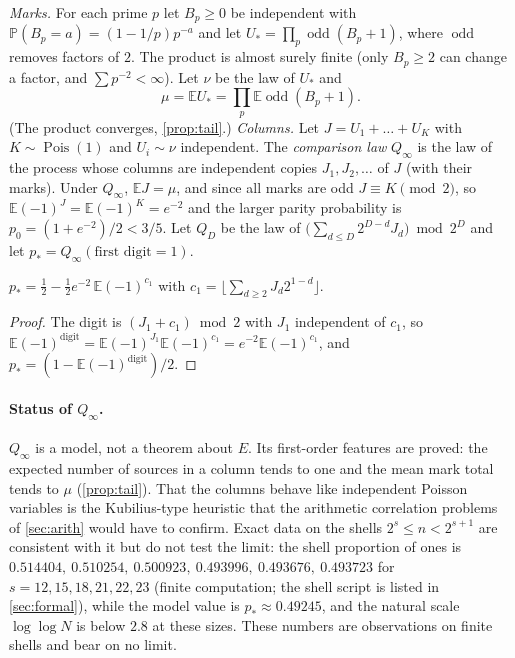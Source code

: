 \documentclass[11pt]{article}
\DeclareMathOperator{\Pois}{Pois}
\renewcommand{\Pr}{\mathbb P}
\newcommand{\Ex}{\mathbb E}
\newcommand{\Qinf}{{Q_\infty}}
\begin{document}
\emph{Marks.} For each prime $p$ let $B_p\ge0$ be independent with $\Pr(B_p=a)=(1-1/p)p^{-a}$ and let $U_*=\prod_p\operatorname{odd}(B_p+1)$, where $\operatorname{odd}$ removes factors of $2$. The product is almost surely finite (only $B_p\ge2$ can change a factor, and $\sum p^{-2}<\infty$). Let $\nu$ be the law of $U_*$ and
\[
\mu=\Ex U_*=\prod_p\Ex\operatorname{odd}(B_p+1).
\]
(The product converges, \cref{prop:tail}.) \emph{Columns.} Let $J=U_1+\dots+U_K$ with $K\sim\Pois(1)$ and $U_i\sim\nu$ independent. The \emph{comparison law} $\Qinf$ is the law of the process whose columns are independent copies $J_1,J_2,\ldots$ of $J$ (with their marks). Under $\Qinf$, $\Ex J=\mu$, and since all marks are odd $J\equiv K\pmod 2$, so $\Ex(-1)^J=\Ex(-1)^K=e^{-2}$ and the larger parity probability is $p_0=(1+e^{-2})/2<3/5$. Let $Q_D$ be the law of $\bigl(\sum_{d\le D}2^{D-d}J_d\bigr)\bmod 2^D$ and let $p_*=\Qinf(\text{first digit}=1)$.

\begin{proposition}[Value of $p_*$]\label{prop:pstar}
$p_*=\tfrac12-\tfrac12e^{-2}\,\Ex(-1)^{c_1}$ with $c_1=\lfloor\sum_{d\ge2}J_d2^{1-d}\rfloor$.
\end{proposition}
\begin{proof}
The digit is $(J_1+c_1)\bmod2$ with $J_1$ independent of $c_1$, so $\Ex(-1)^{\text{digit}}=\Ex(-1)^{J_1}\Ex(-1)^{c_1}=e^{-2}\Ex(-1)^{c_1}$, and $p_*=(1-\Ex(-1)^{\text{digit}})/2$.
\end{proof}

\paragraph{Status of $\Qinf$.} $\Qinf$ is a model, not a theorem about $E$. Its first-order features are proved: the expected number of sources in a column tends to one and the mean mark total tends to $\mu$ (\cref{prop:tail}). That the columns behave like independent Poisson variables is the Kubilius-type heuristic that the arithmetic correlation problems of \cref{sec:arith} would have to confirm. Exact data on the shells $2^s\le n<2^{s+1}$ are consistent with it but do not test the limit: the shell proportion of ones is $0.514404,\ 0.510254,\ 0.500923,\ 0.493996,\ 0.493676,\ 0.493723$ for $s=12,15,18,21,22,23$ (finite computation; the shell script is listed in \cref{sec:formal}), while the model value is $p_*\approx0.49245$, and the natural scale $\log\log N$ is below $2.8$ at these sizes. These numbers are observations on finite shells and bear on no limit.
\end{document}
